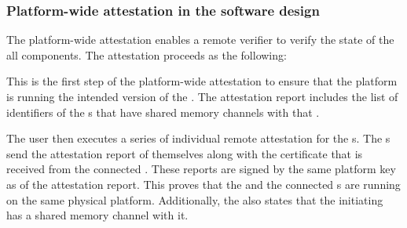 \subsubsection{Platform-wide attestation in the software design}

The platform-wide attestation enables a remote verifier to verify the state of the all \nameenclave components. The attestation proceeds as the following:

\setcounter{para}{0}
 This is the first step of the  platform-wide attestation to ensure that the platform is running the intended version of the \app. The \app attestation report includes the list of identifiers of the \ce{}s that have shared memory channels with that \app.
    
 The user then executes a series of individual remote attestation for the \ce{}s. The \ce{}s send the attestation report of themselves along with the certificate that is received from the connected \sphw. These reports are signed by the same platform key as of the \app attestation report. This proves that the \app and the connected \ce{}s are running on the same physical platform. Additionally, the \ce also states that the initiating \app has a shared memory channel with it.
\setcounter{para}{0}



